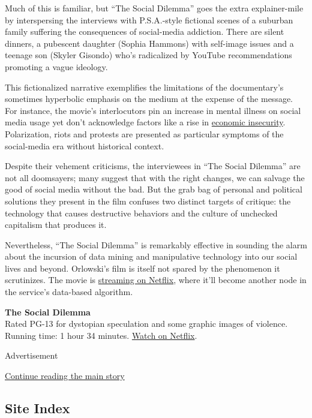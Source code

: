 Much of this is familiar, but ``The Social Dilemma'' goes the extra
explainer-mile by interspersing the interviews with P.S.A.-style
fictional scenes of a suburban family suffering the consequences of
social-media addiction. There are silent dinners, a pubescent daughter
(Sophia Hammons) with self-image issues and a teenage son (Skyler
Gisondo) who's radicalized by YouTube recommendations promoting a vague
ideology.

This fictionalized narrative exemplifies the limitations of the
documentary's sometimes hyperbolic emphasis on the medium at the expense
of the message. For instance, the movie's interlocutors pin an increase
in mental illness on social media usage yet don't acknowledge factors
like a rise in
\href{https://www.nytimes3xbfgragh.onion/2015/07/13/business/rising-economic-insecurity-tied-to-decades-long-trend-in-employment-practices.html}{economic
insecurity}. Polarization, riots and protests are presented as
particular symptoms of the social-media era without historical context.

Despite their vehement criticisms, the interviewees in ``The Social
Dilemma'' are not all doomsayers; many suggest that with the right
changes, we can salvage the good of social media without the bad. But
the grab bag of personal and political solutions they present in the
film confuses two distinct targets of critique: the technology that
causes destructive behaviors and the culture of unchecked capitalism
that produces it.

Nevertheless, ``The Social Dilemma'' is remarkably effective in sounding
the alarm about the incursion of data mining and manipulative technology
into our social lives and beyond. Orlowski's film is itself not spared
by the phenomenon it scrutinizes. The movie is
\href{https://www.netflix.com/title/81254224}{streaming on Netflix},
where it'll become another node in the service's data-based algorithm.

\textbf{The Social Dilemma}\\
Rated PG-13 for dystopian speculation and some graphic images of
violence. Running time: 1 hour 34 minutes.
\href{https://www.netflix.com/title/81254224}{Watch on Netflix}.

Advertisement

\protect\hyperlink{after-bottom}{Continue reading the main story}

\hypertarget{site-index}{%
\subsection{Site Index}\label{site-index}}

